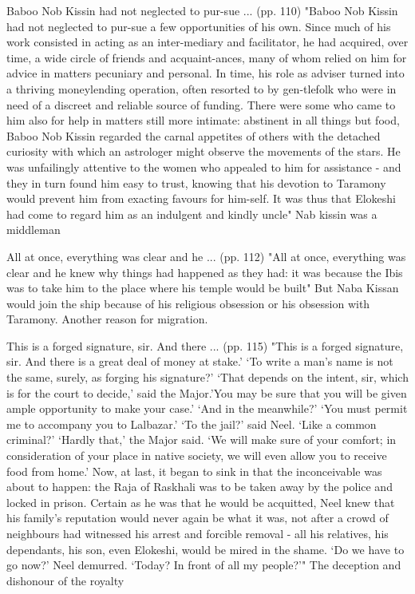 Baboo Nob Kissin had not neglected to pur-sue ... (pp. 110)
"Baboo Nob Kissin had not neglected to pur-sue a few opportunities of his own. Since much of his work consisted in acting as an inter-mediary and facilitator, he had acquired, over time, a wide circle of friends and acquaint-ances, many of whom relied on him for advice in matters pecuniary and personal. In time, his role as adviser turned into a thriving moneylending operation, often resorted to by gen-tlefolk who were in need of a discreet and reliable source of funding. There were some who came to him also for help in matters still more intimate: abstinent in all things but food, Baboo Nob Kissin regarded the carnal appetites of others with the detached curiosity with which an astrologer might observe the movements of the stars. He was unfailingly attentive to the women who appealed to him for assistance - and they in turn found him easy to trust, knowing that his devotion to Taramony would prevent him from exacting favours for him-self. It was thus that Elokeshi had come to regard him as an indulgent and kindly uncle"
Nab kissin was a middleman

All at once, everything was clear and he ... (pp. 112)
"All at once, everything was clear and he knew why things had happened as they had: it was because the Ibis was to take him to the place where his temple would be built"
But Naba Kissan would join the ship because of his religious obsession or his obsession with Taramony. Another reason for migration.

This is a forged signature, sir. And there ... (pp. 115)
"This is a forged signature, sir. And there is a great deal of money at stake.’ ‘To write a man’s name is not the same, surely, as forging his signature?’ ‘That depends on the intent, sir, which is for the court to decide,’ said the Major.’You may be sure that you will be given ample opportunity to make your case.’ ‘And in the meanwhile?’ ‘You must permit me to accompany you to Lalbazar.’ ‘To the jail?’ said Neel. ‘Like a common criminal?’ ‘Hardly that,’ the Major said. ‘We will make sure of your comfort; in consideration of your place in native society, we will even allow you to receive food from home.’ Now, at last, it began to sink in that the inconceivable was about to happen: the Raja of Raskhali was to be taken away by the police and locked in prison. Certain as he was that he would be acquitted, Neel knew that his family’s reputation would never again be what it was, not after a crowd of neighbours had witnessed his arrest and forcible removal - all his relatives, his dependants, his son, even Elokeshi, would be mired in the shame. ‘Do we have to go now?’ Neel demurred. ‘Today? In front of all my people?’"
The deception and dishonour of the royalty


